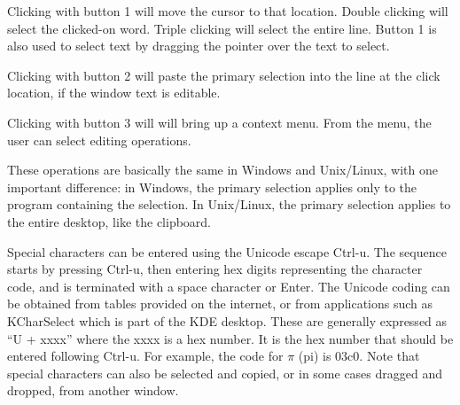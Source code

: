 Clicking with button 1 will move the cursor to that location.  Double
clicking will select the clicked-on word.  Triple clicking will select
the entire line.  Button 1 is also used to select text by dragging the
pointer over the text to select.

Clicking with button 2 will paste the primary selection into the line
at the click location, if the window text is editable.

Clicking with button 3 will will bring up a context menu.  From the
menu, the user can select editing operations.

These operations are basically the same in Windows and Unix/Linux,
with one important difference:  in Windows, the primary selection
applies only to the program containing the selection.  In Unix/Linux,
the primary selection applies to the entire desktop, like the
clipboard.

Special characters can be entered using the Unicode escape {\kb
Ctrl-u}.  The sequence starts by pressing {\kb Ctrl-u}, then entering
hex digits representing the character code, and is terminated with a
space character or {\kb Enter}.  The Unicode coding can be obtained
from tables provided on the internet, or from applications such as
KCharSelect which is part of the KDE desktop.  These are generally
expressed as ``{\vt U + xxxx}'' where the {\vt xxxx} is a hex number. 
It is the hex number that should be entered following {\kb Ctrl-u}. 
For example, the code for ${\pi}$ (pi) is {\vt 03c0}.  Note that
special characters can also be selected and copied, or in some cases
dragged and dropped, from another window.


